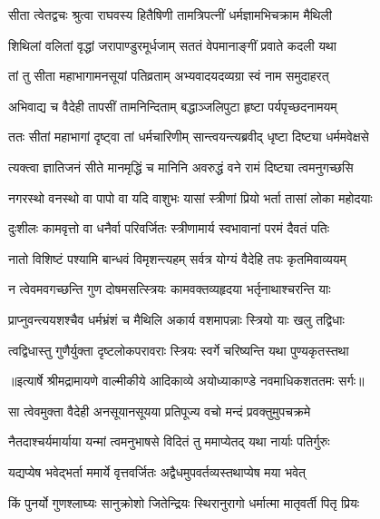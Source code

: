 \twolineshloka
{सीता त्वेतद्वचः श्रुत्वा राघवस्य हितैषिणी}
{तामत्रिपत्नीं धर्मज्ञामभिचक्राम मैथिली} %

\twolineshloka
{शिथिलां वलितां वृद्धां जरापाण्डुरमूर्धजाम्}
{सततं वेपमानाङ्गीं प्रवाते कदली यथा} %

\twolineshloka
{तां तु सीता महाभागामनसूयां पतिव्रताम्}
{अभ्यवादयदव्यग्रा स्वं नाम समुदाहरत्} %

\twolineshloka
{अभिवाद्य च वैदेही तापसीं तामनिन्दिताम्}
{बद्धाञ्जलिपुटा हृष्टा पर्यपृच्छदनामयम्} %

\twolineshloka
{ततः सीतां महाभागां दृष्ट्वा तां धर्मचारिणीम्}
{सान्त्वयन्त्यब्रवीद् धृष्टा दिष्ट्या धर्ममवेक्षसे} %

\twolineshloka
{त्यक्त्वा ज्ञातिजनं सीते मानमृद्धिं च मानिनि}
{अवरुद्धं वने रामं दिष्ट्या त्वमनुगच्छसि} %

\twolineshloka
{नगरस्थो वनस्थो वा पापो वा यदि वाशुभः}
{यासां स्त्रीणां प्रियो भर्ता तासां लोका महोदयाः} %

\twolineshloka
{दुःशीलः कामवृत्तो वा धनैर्वा परिवर्जितः}
{स्त्रीणामार्य स्वभावानां परमं दैवतं पतिः} %

\twolineshloka
{नातो विशिष्टं पश्यामि बान्धवं विमृशन्त्यहम्}
{सर्वत्र योग्यं वैदेहि तपः कृतमिवाव्ययम्} %

\twolineshloka
{न त्वेवमवगच्छन्ति गुण दोषमसत्स्त्रियः}
{कामवक्तव्यहृदया भर्तृनाथाश्चरन्ति याः} %

\twolineshloka
{प्राप्नुवन्त्ययशश्चैव धर्मभ्रंशं च मैथिलि}
{अकार्य वशमापन्नाः स्त्रियो याः खलु तद्विधाः} %

\twolineshloka
{त्वद्विधास्तु गुणैर्युक्ता दृष्टलोकपरावराः}
{स्त्रियः स्वर्गे चरिष्यन्ति यथा पुण्यकृतस्तथा} %


{॥इत्यार्षे श्रीमद्रामायणे वाल्मीकीये आदिकाव्ये अयोध्याकाण्डे नवमाधिकशततमः सर्गः॥}


\twolineshloka
{सा त्वेवमुक्ता वैदेही अनसूयानसूयया}
{प्रतिपूज्य वचो मन्दं प्रवक्तुमुपचक्रमे} %

\twolineshloka
{नैतदाश्चर्यमार्याया यन्मां त्वमनुभाषसे}
{विदितं तु ममाप्येतद् यथा नार्याः पतिर्गुरुः} %

\twolineshloka
{यद्यप्येष भवेद्भर्ता ममार्ये वृत्तवर्जितः}
{अद्वैधमुपवर्तव्यस्तथाप्येष मया भवेत्} %

\twolineshloka
{किं पुनर्यो गुणश्लाघ्यः सानुक्रोशो जितेन्द्रियः}
{स्थिरानुरागो धर्मात्मा मातृवर्ती पितृ प्रियः} %

